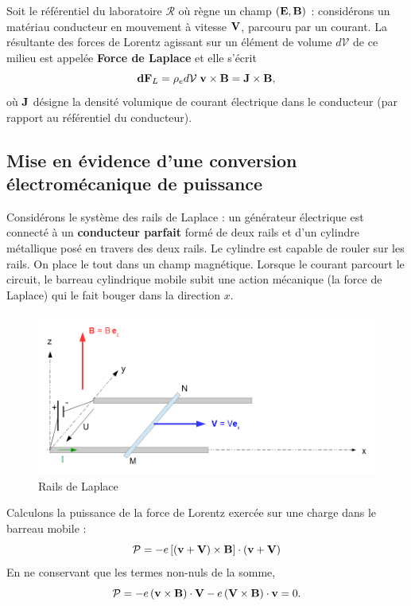 \documentclass[11pt,a4paper]{report}
\begin{document}
Soit le référentiel du laboratoire $\mathcal{R}$ où règne un champ $(\bold{E},\bold{B})$ : considérons un matériau conducteur en mouvement à vitesse $\bold{V}$, parcouru par un courant. La résultante des forces de Lorentz agissant sur un élément de volume $d\mathcal{V}$ de ce milieu est appelée \textbf{Force de Laplace} et elle s'écrit
\begin{equation}
	\bold{dF}_L = \rho_e d\mathcal{V}\;\bold{v}\times\bold{B} = \bold{J}\times\bold{B},
\end{equation}
où $\bold{J}$ désigne la densité volumique de courant électrique dans le conducteur (par rapport au référentiel du conducteur).

\subsection{Mise en évidence d'une conversion électromécanique de puissance}

Considérons le système des rails de Laplace : un générateur électrique est connecté à un \textbf{conducteur parfait} formé de deux rails et d'un cylindre métallique posé en travers des deux rails. Le cylindre est capable de rouler sur les rails. On place le tout dans un champ magnétique. Lorsque le courant parcourt le circuit, le barreau cylindrique mobile subit une action mécanique (la force de Laplace) qui le fait bouger dans la direction $x$.

\begin{figure}[h!]
	\begin{center}
		\includegraphics[scale = 0.70]{rails_Laplace.png}
		\caption{Rails de Laplace} 
		\label{fig:rails_Laplace}
	\end{center}
\end{figure}
		
Calculons la puissance de la force de Lorentz exercée sur une charge dans le barreau mobile :
\begin{equation}
	\mathcal{P} = -e\left[\left(\bold{v} + \bold{V} \right)\times\bold{B}\right]
	\cdot\left(\bold{v} + \bold{V}\right)
\end{equation}
En ne conservant que les termes non-nuls de la somme,
\begin{equation}
	\mathcal{P} = -e\left(\bold{v}\times\bold{B}\right)\cdot\bold{V} 
	-e\left(\bold{V}\times\bold{B}\right)\cdot\bold{v} = 0.
\end{equation} 
\end{document}

